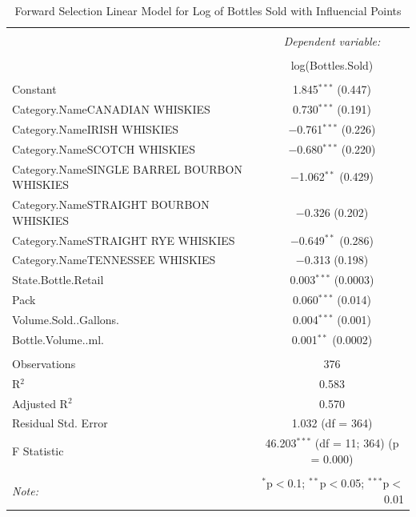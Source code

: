 \documentclass[]{elsarticle} %
\begin{document}
\begin{table}[!htbp] \centering 
  \caption{Forward Selection Linear Model for Log of Bottles Sold with Influencial Points} 
  \label{} 
\normalsize 
\begin{tabular}{@{\extracolsep{5pt}}lc} 
\\[-1.8ex]\hline 
\hline \\[-1.8ex] 
 & \multicolumn{1}{c}{\textit{Dependent variable:}} \\ 
\cline{2-2} 
\\[-1.8ex] & log(Bottles.Sold) \\ 
\hline \\[-1.8ex] 
 Constant & 1.845$^{***}$ (0.447) \\ 
  Category.NameCANADIAN WHISKIES & 0.730$^{***}$ (0.191) \\ 
  Category.NameIRISH WHISKIES & $-$0.761$^{***}$ (0.226) \\ 
  Category.NameSCOTCH WHISKIES & $-$0.680$^{***}$ (0.220) \\ 
  Category.NameSINGLE BARREL BOURBON WHISKIES & $-$1.062$^{**}$ (0.429) \\ 
  Category.NameSTRAIGHT BOURBON WHISKIES & $-$0.326 (0.202) \\ 
  Category.NameSTRAIGHT RYE WHISKIES & $-$0.649$^{**}$ (0.286) \\ 
  Category.NameTENNESSEE WHISKIES & $-$0.313 (0.198) \\ 
  State.Bottle.Retail & 0.003$^{***}$ (0.0003) \\ 
  Pack & 0.060$^{***}$ (0.014) \\ 
  Volume.Sold..Gallons. & 0.004$^{***}$ (0.001) \\ 
  Bottle.Volume..ml. & 0.001$^{**}$ (0.0002) \\ 
 \hline \\[-1.8ex] 
Observations & 376 \\ 
R$^{2}$ & 0.583 \\ 
Adjusted R$^{2}$ & 0.570 \\ 
Residual Std. Error & 1.032 (df = 364) \\ 
F Statistic & 46.203$^{***}$ (df = 11; 364)  (p = 0.000) \\ 
\hline 
\hline \\[-1.8ex] 
\textit{Note:}  & \multicolumn{1}{r}{$^{*}$p$<$0.1; $^{**}$p$<$0.05; $^{***}$p$<$0.01} \\ 
\end{tabular} 
\end{table}
\end{document}
